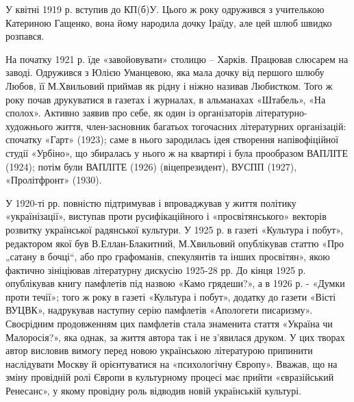 У квітні 1919 р. вступив до КП(б)У. Цього ж року одружився з учителькою
Катериною Гащенко, вона йому народила дочку Іраїду, але цей шлюб швидко
розпався.

На початку 1921 р. їде «завойовувати» столицю – Харків. Працював слюсарем на
заводі. Одружився з Юлією Уманцевою, яка мала дочку від першого шлюбу Любов, її
М.Хвильовий приймав як рідну і ніжно називав Любистком. Того ж року почав
друкуватися в газетах і журналах, в альманахах «Штабель», «На сполох». Активно
заявив про себе, як один із організаторів літературно-художнього життя,
член-засновник багатьох тогочасних літературних організацій: спочатку «Гарт»
(1923); саме в нього зародилась ідея створення напівофіційної студії «Урбіно»,
що збиралась у нього ж на квартирі і була прообразом ВАПЛІТЕ (1924); потім були
ВАПЛІТЕ (1926) (віцепрезидент), ВУСПП (1927), «Пролітфронт» (1930).

У 1920-ті рр. повністю підтримував і впроваджував у життя політику
«українізації», виступав проти русифікаційного і «просвітянського» векторів
розвитку української радянської культури. У 1925 р. в газеті «Культура і
побут», редактором якої був В.Еллан-Блакитний, М.Хвильовий опублікував статтю
«Про „сатану в бочці“, або про графоманів, спекулянтів та інших просвітян»,
якою фактично зініціював літературну дискусію 1925-28 рр. До кінця 1925 р.
опублікував книгу памфлетів під назвою «Камо грядеши?», а в 1926 р. - «Думки
проти течії»; того ж року в газеті «Культура і побут», додатку до газети «Вісті
ВУЦВК», надрукував наступну серію памфлетів «Апологети писаризму». Своєрідним
продовженням цих памфлетів стала знаменита стаття «Україна чи Малоросія?», яка
однак, за життя автора так і не з'явилася друком. У цих творах автор висловив
вимогу перед новою українською літературою припинити наслідувати Москву й
орієнтуватися на «психологічну Європу». Вважав, що на зміну провідній ролі
Європи в культурному процесі має прийти «євразійський Ренесанс», у якому
провідну роль відводив новій українській культурі.

